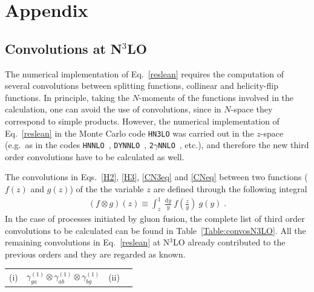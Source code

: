 \documentclass[12pt]{article}
\def\beeq{\begin{eqnarray}}
\def\eeeq{\end{eqnarray}}
\newcommand\f[2]{\frac{#1}{#2}}
\DeclareRobustCommand{\rd}{\ensuremath{\mathrm{d}}}
\begin{document}
\section*{Appendix}
\begin{appendix}
\section{Convolutions at N$^\text{3}$LO}
\label{app:Convos}
The numerical implementation of Eq.~\eqref{reslean} requires the computation of several convolutions between splitting functions, collinear and helicity-flip functions. In principle, taking the $N$-moments of the functions involved in the calculation, one can avoid the use of convolutions, since in $N$-space they correspond to simple products. However, the numerical implementation of Eq.~\eqref{reslean} in the Monte Carlo code \texttt{HN3LO} was carried out in the $z$-space (e.g.\ as in the codes \texttt{HNNLO}~\cite{Catani:2007vq}, \texttt{DYNNLO}~\cite{Catani:2009sm}, \texttt{2$\gamma$NNLO}~\cite{Catani:2011qz}, etc.), and therefore the new third order convolutions have to be calculated as well. 

The convolutions in Eqs.~\eqref{H2}, \eqref{H3}, \eqref{CN3eq} and \eqref{CNeq} between two functions ($f(z)$ and $g(z)$) of the the variable $z$ are defined through the following integral
\beeq
\left( f \otimes g \right)(z) \equiv \int^{1}_{z}~\f{\rd y}{y}~f\left(\f{z}{y}\right)~g(y)\;.
\eeeq
In the case of processes initiated by gluon fusion, the complete list of third order convolutions to be calculated can be found in Table~\ref{Table:convosN3LO}. All the remaining convolutions in Eq.~\eqref{reslean} at N$^{3}$LO already  contributed to the previous orders and they are regarded as known.
\begin{table}
\begin{center}
\renewcommand{\arraystretch}{1.5}
\begin{tabular}{ |c|c||c|c| }
\hline
\multirow{1}{*}{(i)} 

& $\gamma^{(1)}_{ga}\otimes\gamma^{(1)}_{a b}\otimes\gamma^{(1)}_{bg}$

& \multirow{1}{*}{(ii)} 


\end{tabular}
\end{center}
\end{table}
\end{appendix}
\end{document}
